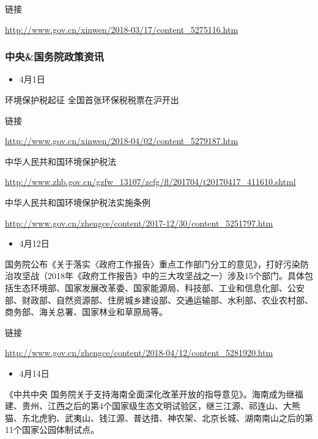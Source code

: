 \documentclass[]{book}
\providecommand{\tightlist}{%
  \setlength{\itemsep}{0pt}\setlength{\parskip}{0pt}}
\begin{document}
链接

\url{http://www.gov.cn/xinwen/2018-03/17/content_5275116.htm}

\hypertarget{ux4e2dux592eux56fdux52a1ux9662ux653fux7b56ux8d44ux8baf}{%
\subsubsection*{中央\&国务院政策资讯}\label{ux4e2dux592eux56fdux52a1ux9662ux653fux7b56ux8d44ux8baf}}

\begin{itemize}
\tightlist
\item
  4月1日
\end{itemize}

环境保护税起征 全国首张环保税税票在沪开出

链接

\url{http://www.gov.cn/xinwen/2018-04/02/content_5279187.htm}

中华人民共和国环境保护税法

\url{http://www.zhb.gov.cn/gzfw_13107/zcfg/fl/201704/t20170417_411610.shtml}

中华人民共和国环境保护税法实施条例

\url{http://www.gov.cn/zhengce/content/2017-12/30/content_5251797.htm}

\begin{itemize}
\tightlist
\item
  4月12日
\end{itemize}

国务院公布《关于落实〈政府工作报告〉重点工作部门分工的意见》，打好污染防治攻坚战（2018年《政府工作报告》中的三大攻坚战之一）涉及15个部门。具体包括生态环境部、国家发展改革委、国家能源局、科技部、工业和信息化部、公安部、财政部、自然资源部、住房城乡建设部、交通运输部、水利部、农业农村部、商务部、海关总署、国家林业和草原局等。

链接

\url{http://www.gov.cn/zhengce/content/2018-04/12/content_5281920.htm}

\begin{itemize}
\tightlist
\item
  4月14日
\end{itemize}

《中共中央 国务院关于支持海南全面深化改革开放的指导意见》。海南成为继福建、贵州、江西之后的第4个国家级生态文明试验区，继三江源、祁连山、大熊猫、东北虎豹、武夷山、钱江源、普达措、神农架、北京长城、湖南南山之后的第11个国家公园体制试点。
\end{document}
